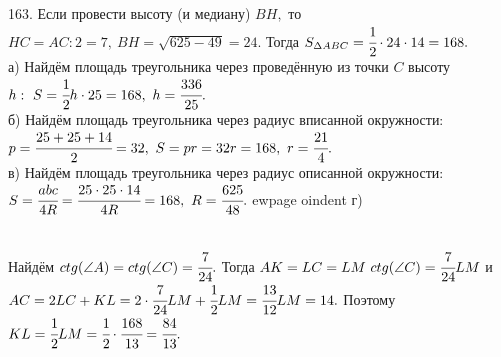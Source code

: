 163. Если провести высоту (и медиану) $BH,$ то $HC=AC:2=7,\ BH=\sqrt{625-49}=24.$ Тогда $S_{\Delta ABC}=\cfrac{1}{2}\cdot24\cdot14=168.$\\
а) Найдём площадь треугольника через проведённую из точки $C$ высоту $h:\ S=\cfrac{1}{2}h\cdot25=168,\ h=\cfrac{336}{25}.$\\
б) Найдём площадь треугольника через радиус вписанной окружности: $p=\cfrac{25+25+14}{2}=32,\ S=pr=32r=168,\ r=\cfrac{21}{4}.$\\
в) Найдём площадь треугольника через радиус описанной окружности: $S=\cfrac{abc}{4R}=\cfrac{25\cdot25\cdot14}{4R}=168,\ R=\cfrac{625}{48}.$
ewpage
oindent
г) \begin{figure}[ht!]
\end{figure}\\
Найдём $ctg(\angle A)=ctg(\angle C)=\cfrac{7}{24}.$ Тогда $AK=LC=LM\ ctg(\angle C)=\cfrac{7}{24}LM$ и $AC=2LC+KL=2\cdot\cfrac{7}{24}LM+\cfrac{1}{2}LM=\cfrac{13}{12}LM=14.$ Поэтому $KL=\cfrac{1}{2}LM=\cfrac{1}{2}\cdot\cfrac{168}{13}=\cfrac{84}{13}.$\\
